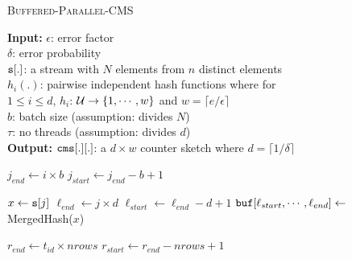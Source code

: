 \documentclass[10pt, conference, compsocconf]{IEEEtran}
\renewcommand{\algorithmicrequire}{\textbf{Input:}}
\renewcommand{\algorithmicensure}{\textbf{Output:}}
\begin{document}
 \begin{algorithm}[htbp]
  	\small
  	\caption{\textsc{Buffered-Parallel-CMS}} 
  	\algorithmicrequire{  $\epsilon$: error factor\\
	 		\hspace*{6ex} $\delta$: error probability \\
	 	  \hspace*{7ex}${\tt s}[.]$: a stream with $N$ elements from $n$ distinct elements \\ 
		  \hspace*{7ex}$h_i(.)$: pairwise independent hash functions where for \\ 
		  \hspace*{13ex}$1\leq i \leq d$,  $h_i$: ${\cal U} \rightarrow \{1,\cdots,w\}$ and $w = \lceil e/\epsilon \rceil$\\
		  \hspace*{7ex}$b$: batch size (assumption: divides $N$)\\
		  \hspace*{7ex}$\tau$: no threads (assumption: divides $d$)\\ }
	 \algorithmicensure{ ${\tt cms}[.][.]$: a $d \times w$ counter sketch where $d = \lceil 1/\delta \rceil$ \\
	 }
  	\begin{algorithmic}[1]
		\State{}
		
			\State $j_{end} \leftarrow i \times b$	 
			\State $j_{start} \leftarrow j_{end} - b + 1$
			
				\State $x  \leftarrow {\tt s}[j]$
				\State $\ell_{end} \leftarrow j \times d$
				\State $\ell_{start} \leftarrow \ell_{end} - d + 1$
				\State ${\tt buf}[\ell_{start}, \cdots, \ell_{end}] \leftarrow$ {\sc MergedHash}($x$)
			\EndFor
			
			
			 
					\State $r_{end} \leftarrow t_{id} \times nrows$
					\State $r_{start} \leftarrow r_{end} - nrows + 1$
					\EndFor
				\EndFor
			\EndFor

			
		\EndFor
	\end{algorithmic}
	\label{alg:cms_construct_par}
\end{algorithm} 	
\end{document}

